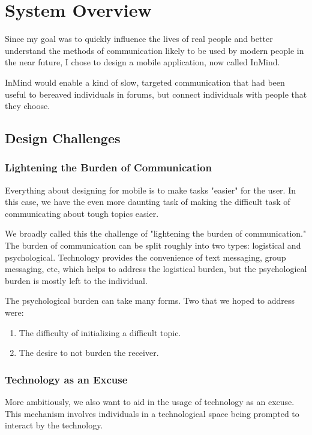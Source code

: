 \chapter{System Overview}
  Since my goal was to quickly influence the lives of real people
  and better understand the methods of communication likely to be used by
  modern people in the near future, I chose to design
  a mobile application, now called InMind.

  InMind would enable a kind of slow,
  targeted communication that had been useful to bereaved individuals in forums,
  but connect individuals with people that they choose.

  \section{Design Challenges}
    \subsection{Lightening the Burden of Communication}
    Everything about designing for mobile is to make tasks "easier" for the user.
    In this case, we have the even more daunting task of making
    the difficult task of communicating about tough topics easier.

    We broadly called this the challenge of "lightening the burden of communication."
    The burden of communication can be split roughly into two types:
    logistical and psychological.
    Technology provides the convenience of text messaging,
    group messaging, etc, which helps to address the logistical burden,
    but the psychological burden is mostly left to the individual.

    The psychological burden can take many forms.
    Two that we hoped to address were:
    \begin{enumerate}
    \item The difficulty of initializing a difficult topic.
    \item The desire to not burden the receiver.
    \end{enumerate}

    \subsection{Technology as an Excuse}
    More ambitiously, we also want to aid in the usage of technology as an excuse.
    This mechanism involves individuals in a technological space being prompted
    to interact by the technology.
    
